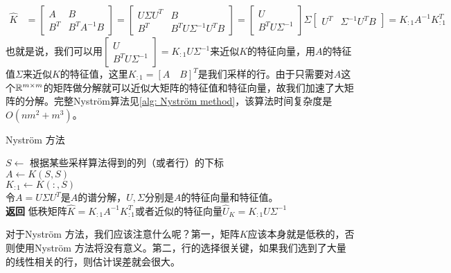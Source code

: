 \begin{align*}
    \hat{K} & = \begin{bmatrix}
            A & B \\
            B^T & B^T A^{-1} B
          \end{bmatrix} 
          = \begin{bmatrix}
              U\Sigma U^T & B \\
            B^T & B^T U \Sigma^{-1} U^T B
          \end{bmatrix}
          = \begin{bmatrix}
            U \\
            B^T U \Sigma^{-1}
          \end{bmatrix} \Sigma
          \begin{bmatrix}
            U^T & \Sigma^{-1}U^T B
          \end{bmatrix}
          = K_{:1}A^{-1}K_{:1}^T
\end{align*}
也就是说，我们可以用$\begin{bmatrix} U \\ B^T U \Sigma^{-1} \end{bmatrix} = K_{:1}U\Sigma^{-1}$来近似$K$的特征向量，用$A$的特征值$\Sigma$来近似$K$的特征值，这里$K_{:1} = [A \quad B]^T$是我们采样的行。由于只需要对$A$这个$\mathbb{R}^{m\times m}$的矩阵做分解就可以近似大矩阵的特征值和特征向量，故我们加速了大矩阵的分解。完整Nyström算法见\ref{alg: Nyström method}，该算法时间复杂度是$O(nm^2 + m^3)$。
\begin{algorithm}
    \caption{Nyström 方法}\label{alg: Nyström method}
    $S \gets$ 根据某些采样算法得到的列（或者行）的下标 \\
    $A \gets K(S,S)$ \\
    $K_{:1} \gets K(:,S)$ \\
    令$A = U\Sigma U^T$是$A$的谱分解，$U,\Sigma$分别是$A$的特征向量和特征值。\\
    \textbf{返回} 低秩矩阵$\hat{K} = K_{:1}A^{-1}K_{:1}^T$或者近似的特征向量$\hat{U}_K = K_{:1}U\Sigma^{-1}$
\end{algorithm} 
对于Nyström 方法，我们应该注意什么呢？第一，矩阵$K$应该本身就是低秩的，否则使用Nyström 方法将没有意义。第二，行的选择很关键，如果我们选到了大量的线性相关的行，则估计误差就会很大。
